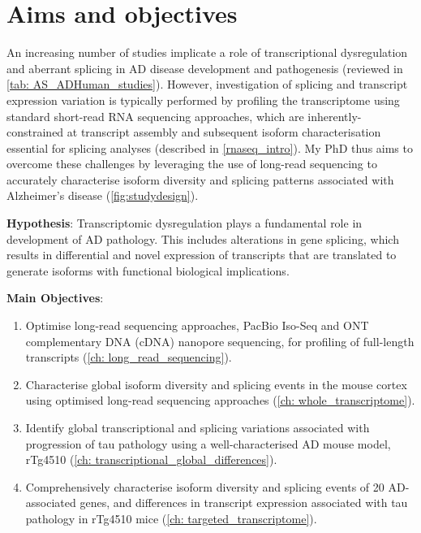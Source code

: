 \newpage
\section{Aims and objectives}
An increasing number of studies implicate a role of transcriptional dysregulation and aberrant splicing in AD disease development and pathogenesis (reviewed in \cref{tab: AS_ADHuman_studies}). However, investigation of splicing and transcript expression variation is typically performed by profiling the transcriptome using standard short-read RNA sequencing approaches, which are inherently-constrained at transcript assembly and subsequent isoform characterisation essential for splicing analyses (described in \cref{rnaseq_intro}). My PhD thus aims to overcome these challenges by leveraging the use of long-read sequencing to accurately characterise isoform diversity and splicing patterns associated with Alzheimer's disease (\cref{fig:studydesign}).


\textbf{Hypothesis}: Transcriptomic dysregulation plays a fundamental role in development of AD pathology. This includes alterations in gene splicing, which results in differential and novel expression of transcripts that are translated to generate isoforms with functional biological implications. 

\textbf{Main Objectives}:

\begin{enumerate}[]
	\item Optimise long-read sequencing approaches, PacBio Iso-Seq and ONT complementary DNA (cDNA) nanopore sequencing, for profiling of full-length transcripts (\cref{ch: long_read_sequencing}). 
	\item Characterise global isoform diversity and splicing events in the mouse cortex using optimised long-read sequencing approaches (\cref{ch: whole_transcriptome}). 
	\item Identify global transcriptional and splicing variations associated with progression of tau pathology using a well-characterised AD mouse model, rTg4510 (\cref{ch: transcriptional_global_differences}).
	\item Comprehensively characterise isoform diversity and splicing events of 20 AD-associated genes, and differences in transcript expression associated with tau pathology in rTg4510 mice (\cref{ch: targeted_transcriptome}).
\end{enumerate}


